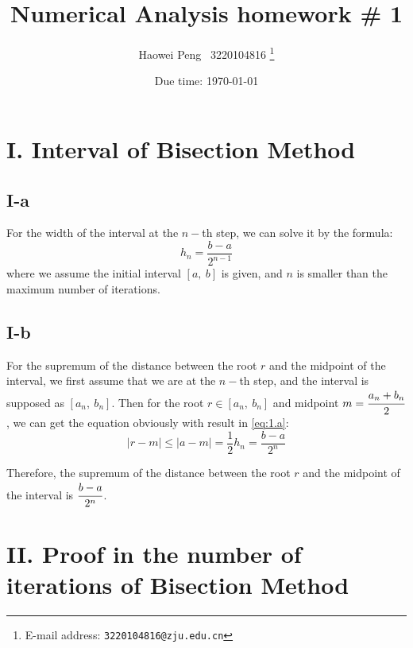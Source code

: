 \documentclass[a4paper]{article}
\begin{document}
\title{Numerical Analysis homework \# 1}

\author{Haowei Peng \ 3220104816
  \thanks{E-mail address: \texttt{3220104816@zju.edu.cn}}}


\date{Due time: \today}

\maketitle

\section*{I. Interval of Bisection Method}

\subsection*{I-a}
\label{sec:1.a}

For the width of the interval at the $n-$th step, we can solve it by the formula:
\begin{equation}
    h_n = \frac{b - a}{2^{n - 1}}
    \label{eq:1.a}
\end{equation}
where we assume the initial interval $[a,\ b]$ is given, and $n$ is smaller than the maximum number of iterations.

\subsection*{I-b}

For the supremum of the distance between the root $r$ and the midpoint of the interval, we first assume that we are at the $n-$th step, and the interval is supposed as $[a_n,\ b_n]$. 
Then for the root $r \in [a_n,\ b_n]$ and midpoint $m = \cfrac{a_n + b_n}{2}$, we can get the equation obviously with result in \ref{eq:1.a}:
\begin{equation}
    |r - m| \leqslant |a - m| = \frac{1}{2} h_n = \frac{b - a}{2^n}
    \label{eq:1.b}
\end{equation}

Therefore, the supremum of the distance between the root $r$ and the midpoint of the interval is $\cfrac{b - a}{2^n}$.

\section*{II. Proof in the number of iterations of Bisection Method}
\end{document}
